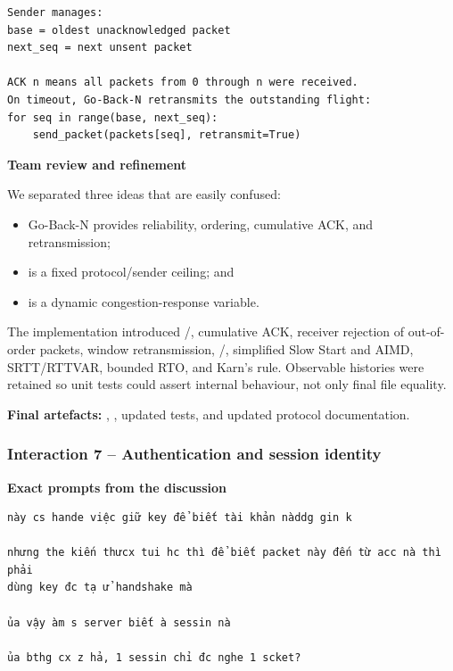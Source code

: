 \begin{lstlisting}
Sender manages:
base = oldest unacknowledged packet
next_seq = next unsent packet

ACK n means all packets from 0 through n were received.
On timeout, Go-Back-N retransmits the outstanding flight:
for seq in range(base, next_seq):
    send_packet(packets[seq], retransmit=True)
\end{lstlisting}

\textbf{Team review and refinement}

We separated three ideas that are easily confused:

\begin{itemize}
  \item Go-Back-N provides reliability, ordering, cumulative ACK, and
        retransmission;
  \item {} is a fixed protocol/sender ceiling; and
  \item {} is a dynamic congestion-response variable.
\end{itemize}

The implementation introduced /, cumulative ACK,
receiver rejection of out-of-order packets, window retransmission,
/, simplified Slow Start and AIMD, SRTT/RTTVAR,
bounded RTO, and Karn's rule. Observable histories were retained so unit tests
could assert internal behaviour, not only final file equality.

\textbf{Final artefacts:} ,
, updated tests, and updated protocol documentation.

\subsubsection{Interaction 7 -- Authentication and session identity}

\sourceB

\textbf{Exact prompts from the discussion}

\begin{lstlisting}
này cs hande việc giữ key để biết tài khản nàddg gin k

nhưng the kiến thưcx tui hc thì để biết packet này đến từ acc nà thì phải
dùng key đc tạ ử handshake mà

ủa vậy àm s server biết à sessin nà

ủa bthg cx z hả, 1 sessin chỉ đc nghe 1 scket?
\end{lstlisting}

